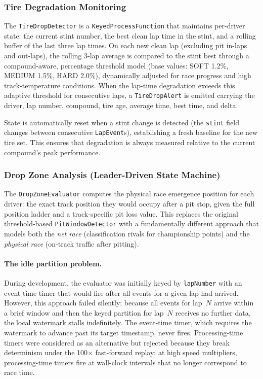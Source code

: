 \documentclass[a4paper,twocolumn]{article}
\begin{document}
\subsubsection{Tire Degradation Monitoring}

The \texttt{TireDropDetector} is a \texttt{KeyedProcessFunction} that
maintains per-driver state: the current stint number, the best clean lap
time in the stint, and a rolling buffer of the last three lap times. On
each new clean lap (excluding pit in-laps and out-laps), the rolling
3-lap average is compared to the stint best through a compound-aware,
percentage threshold model (base values: SOFT 1.2\%, MEDIUM 1.5\%,
HARD 2.0\%), dynamically adjusted for race progress and high
track-temperature conditions. When the lap-time degradation exceeds this
adaptive threshold for consecutive laps, a \texttt{TireDropAlert} is
emitted carrying the driver,
lap number, compound, tire age, average time, best time, and delta.

State is automatically reset when a stint change is detected (the
\texttt{stint} field changes between consecutive \texttt{LapEvent}s),
establishing a fresh baseline for the new tire set. This ensures that
degradation is always measured relative to the current compound's peak
performance.

\subsubsection{Drop Zone Analysis (Leader-Driven State Machine)}

The \texttt{DropZoneEvaluator} computes the physical race emergence
position for each driver: the exact track position they would occupy
after a pit stop, given the full position ladder and a track-specific pit
loss value. This replaces the original threshold-based
\texttt{PitWindowDetector} with a fundamentally different approach that
models both the \emph{net race} (classification rivals for championship
points) and the \emph{physical race} (on-track traffic after pitting).

\paragraph{The idle partition problem.}
During development, the evaluator was initially keyed by
\texttt{lapNumber} with an event-time timer that would fire after all
events for a given lap had arrived. However, this approach failed
silently: because all events for lap~$N$ arrive within a brief window
and then the keyed partition for lap~$N$ receives no further data, the
local watermark stalls indefinitely. The event-time timer, which requires
the watermark to advance past its target timestamp, never fires.
Processing-time timers were considered as an alternative but rejected
because they break determinism under the 100$\times$ fast-forward replay:
at high speed multipliers, processing-time timers fire at wall-clock
intervals that no longer correspond to race time.
\end{document}
